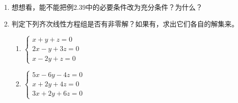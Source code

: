 \begin{ex}
\begin{enumerate}
    \item 想想看，能不能把例2.39中的必要条件改为充分条件？为什么？
    \item 判定下列齐次线性方程组是否有非零解？如果有，求出它们各自的解集来。
    \begin{multicols}{2}
\begin{enumerate}
    \item $\begin{cases}
        x+y+z=0\\2x-y+3z=0\\x-2y+z=0
    \end{cases}$
    \item $\begin{cases}
        5x-6y-4z=0\\x+2y+4z=0\\3x+2y+6z=0
    \end{cases}$
\end{enumerate}        
    \end{multicols}
\end{enumerate}    
\end{ex}

